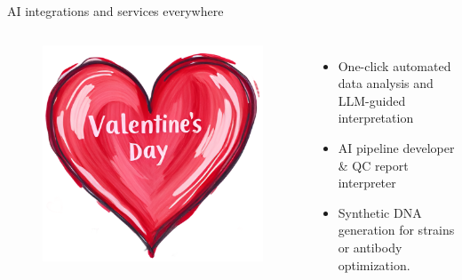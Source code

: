 \documentclass[10pt]{beamer}
\begin{document}
\begin{frame}{AI integrations and services everywhere}
	\begin{columns}[T,onlytextwidth]
		\hspace*{-1.1cm} 
		\begin{figure}
			\includegraphics[width=\textwidth]{figures/Valentine_s_Day_gift_card_square.png}
		\end{figure}
		\begin{itemize}
			\item One-click automated data analysis and LLM-guided interpretation
			\item AI pipeline developer \& QC report interpreter
			\item Synthetic DNA generation for strains or antibody optimization. 
		\end{itemize}
	\vspace{0.3cm} 
	\end{columns}
	\begin{columns}[T,onlytextwidth]
		\hspace*{-1.1cm} 
		\begin{figure}

\end{figure}
\end{columns}
\end{frame}
\end{document}
